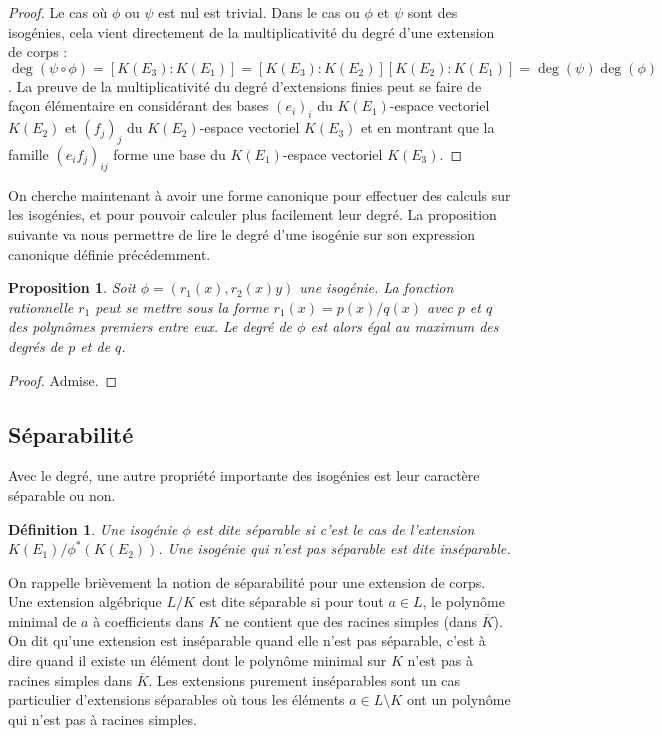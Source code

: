 \documentclass{article}
\theoremstyle{plain}%
\newtheorem{prop}[thm]{Proposition}
\newtheorem{deff}[thm]{Définition}
\theoremstyle{definition}%
\begin{document}
\begin{proof}
  Le cas où $\phi$ ou $\psi$ est nul est trivial. Dans le cas ou $\phi$ et $\psi$ sont des isogénies, cela vient directement de la multiplicativité du degré d'une extension de corps : $\deg(\psi \circ \phi) = [K(E_3) :K(E_1)] = [K(E_3):K(E_2)][K(E_2):K(E_1)] = \deg(\psi)\deg(\phi)$. La preuve de la multiplicativité du degré d'extensions finies peut se faire de façon élémentaire en considérant des bases $(e_i)_i$ du $K(E_1)$-espace vectoriel $K(E_2)$ et $(f_j)_j$ du $K(E_2)$-espace vectoriel $K(E_3)$ et en montrant que la famille $(e_if_j)_{ij}$ forme une base du $K(E_1)$-espace vectoriel $K(E_3)$.
\end{proof}

On cherche maintenant à avoir une forme canonique pour effectuer des calculs sur les isogénies, et pour pouvoir calculer plus facilement leur degré.
La proposition suivante va nous permettre de lire le degré d'une isogénie sur son expression canonique définie précédemment.

\begin{prop}
  \label{caracdeg}
  Soit $\phi = (r_1(x), r_2(x)y)$ une isogénie. La fonction rationnelle $r_1$ peut se mettre sous la forme $r_1(x) = p(x) / q(x)$ avec $p$ et $q$ des polynômes premiers entre eux. Le degré de $\phi$ est alors égal au maximum des degrés de $p$ et de $q$. 
\end{prop}

\begin{proof}
  Admise. 
\end{proof}

\subsection{Séparabilité}

Avec le degré, une autre propriété importante des isogénies est leur caractère séparable ou non.

\begin{deff}
  Une isogénie $\phi$ est dite séparable si c'est le cas de l'extension $K(E_1) / \phi^*(K(E_2))$. Une isogénie qui n'est pas séparable est dite inséparable.
\end{deff}

On rappelle brièvement la notion de séparabilité pour une extension de corps. Une extension algébrique $L/K$ est dite séparable si pour tout $a\in L$, le polynôme minimal de $a$ à coefficients dans $K$ ne contient que des racines simples (dans $\overline{K}$). On dit qu'une extension est inséparable quand elle n'est pas séparable, c'est à dire quand il existe un élément dont le polynôme minimal sur $K$ n'est pas à racines simples dans $\overline{K}$. Les extensions purement inséparables sont un cas particulier d'extensions séparables où tous les éléments $a\in L \setminus K$ ont un polynôme qui n'est pas à racines simples.
\end{document}
